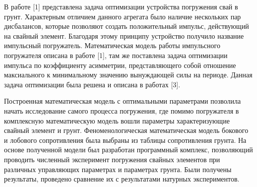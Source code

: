 
\vzmscaption




В работе [1] представлена задача оптимизации устройства погружения свай в грунт. Характерным отличием данного агрегата было наличие нескольких пар дисбалансов, которые позволяют создать положительный импульс, действующий на свайный элемент.
Благодаря этому принципу устройство получило название импульсный погружатель. Математическая модель работы импульсного погружателя описана в работе [1], там же поставлена задача оптимизации импульса по коэффициенту асимметрии,
представляющего собой отношение максиального к минимальному значению вынуждающей силы на периоде. Данная задача оптимизации была решена и описана в работах [3].

Построенная математическая модель с оптимальными параметрами позволила начать исследование самого процесса погружения, где помимо погружателя в комплексную математическую модель вошли параметры характеризующие свайный элемент и грунт.
Феноменологическая математическая модель бокового и лобового сопротивления была выбраны из таблицы сопротивления грунта. На основе полученной модели был разработан программный комплекс,
позволяющий проводить численный эксперимент погружения свайных элементов при различных управляющих параметрах и параметрах грунта.
Были получены результаты, проведено сравнение их с результатами натурных экспериментов.

